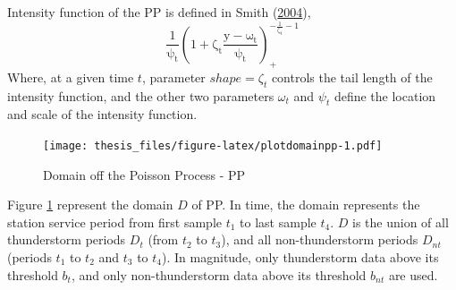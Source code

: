 \documentclass[12pt,oneside]{reedthesis}
\begin{document}
Intensity function of the PP is defined in Smith (\protect\hyperlink{ref-Smith2004}{2004}),
\begin{equation}
  \mathrm{
    \frac{1}{\psi_t}\left(1+\zeta_t\frac{y-\omega_t}{\psi_t}\right)_+^{-\frac{1}{\zeta_t}-1}
  }
  \label{eq:ppintensityfunction}
\end{equation}
Where, at a given time \(t\), parameter \(shape = \zeta_t\) controls the tail length of the intensity function, and the other two parameters \(\omega_t\) and \(\psi_t\) define the location and scale of the intensity function.
\begin{figure}
\centering
\texttt{[image: thesis\_files/figure-latex/plotdomainpp-1.pdf]}
\caption{\label{fig:plotdomainpp}Domain off the Poisson Process - PP}
\end{figure}
Figure \ref{fig:plotdomainpp} represent the domain \(D\) of PP. In time, the domain represents the station service period from first sample \(t_1\) to last sample \(t_4\). \(D\) is the union of all thunderstorm periods \(D_t\) (from \(t_2\) to \(t_3\)), and all non-thunderstorm periods \(D_{nt}\) (periods \(t_1\) to \(t_2\) and \(t_3\) to \(t_4\)). In magnitude, only thunderstorm data above its threshold \(b_t\), and only non-thunderstorm data above its threshold \(b_{nt}\) are used.
\end{document}
